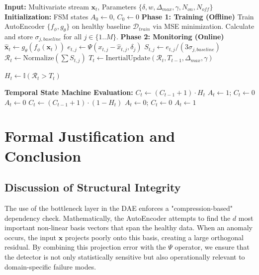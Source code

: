 \documentclass[journal]{IEEEtran}
\begin{document}
	\begin{algorithm}[!h] %
		\caption{Deep Non-Linear Anomaly Detection with Inertial and Temporal Logic}
		\begin{algorithmic}[1]
			\State \textbf{Input:} Multivariate stream $\mathbf{x}_t$, Parameters $\{\delta, w, \Delta_{max}, \gamma, N_{on}, N_{off}\}$
			\State \textbf{Initialization:} FSM states $A_0 \leftarrow 0$, $C_0 \leftarrow 0$
			\State \textbf{Phase 1: Training (Offline)}
			\State Train AutoEncoder $\{f_{\phi}, g_{\theta}\}$ on healthy baseline $\mathcal{D}_{train}$ via MSE minimization.
			\State Calculate and store $\sigma_{j, baseline}$ for all $j \in \{1..M\}$.
			\State \textbf{Phase 2: Monitoring (Online)}
			\State $\hat{\mathbf{x}}_t \leftarrow g_{\theta}(f_{\phi}(\mathbf{x}_t))$ 
			\State $e_{t,j} \leftarrow \Psi(x_{t,j} - \hat{x}_{t,j}, \delta_j)$ 
			\State $S_{t,j} \leftarrow e_{t,j} / (3 \sigma_{j, baseline})$ 
			\State $\mathcal{R}_t \leftarrow \text{Normalize}(\sum S_{t,j})$ 
			\State $T_t \leftarrow \text{InertialUpdate}(\mathcal{R}_t, T_{t-1}, \Delta_{max}, \gamma)$ 
			
			\State $H_t \leftarrow \mathbb{I}(\mathcal{R}_t > T_t)$ 
			
			\State \textbf{Temporal State Machine Evaluation:}
			\State $C_t \leftarrow (C_{t-1} + 1) \cdot H_t$
			\State $A_t \leftarrow 1$; $C_t \leftarrow 0$ 
			\Else
			\State $A_t \leftarrow 0$
			\EndIf
			\Else
			\State $C_t \leftarrow (C_{t-1} + 1) \cdot (1 - H_t)$
			\State $A_t \leftarrow 0$; $C_t \leftarrow 0$ 
			\Else
			\State $A_t \leftarrow 1$
			\EndIf
			\EndIf
			\EndFor
		\end{algorithmic}
	\end{algorithm}
	
	\section{Formal Justification and Conclusion}
	\subsection{Discussion of Structural Integrity}
	The use of the bottleneck layer in the DAE enforces a "compression-based" dependency check. Mathematically, the AutoEncoder attempts to find the $d$ most important non-linear basis vectors that span the healthy data. When an anomaly occurs, the input $\mathbf{x}$ projects poorly onto this basis, creating a large orthogonal residual. By combining this projection error with the $\Psi$ operator, we ensure that the detector is not only statistically sensitive but also operationally relevant to domain-specific failure modes.
	
\end{document}

